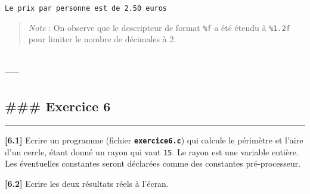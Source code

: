 \documentclass[11pt]{article}
\begin{document}
    \begin{Verbatim}[commandchars=\\\{\}]
Le prix par personne est de 2.50 euros
    \end{Verbatim}

    \begin{quote}
\emph{Note} : On observe que le descripteur de format \texttt{\%f} a été
étendu à \texttt{\%1.2f} pour limiter le nombre de décimales à 2.
\end{quote}

    \hypertarget{section}{%
\subsection{---}\label{section}}

\hypertarget{exercice-6}{%
\subsection{\#\#\# Exercice 6}\label{exercice-6}}

\begin{center}\rule{0.5\linewidth}{0.5pt}\end{center}

    \textbf{{[}6.1{]}} Ecrire un programme (fichier
\textbf{\texttt{exercice6.c}}) qui calcule le périmètre et l'aire d'un
cercle, étant donné un rayon qui vaut \texttt{15}. Le rayon est une
variable entière. Les éventuelles constantes seront déclarées comme des
constantes pré-processeur.

\textbf{{[}6.2{]}} Ecrire les deux résultats réels à l'écran.
\end{document}
